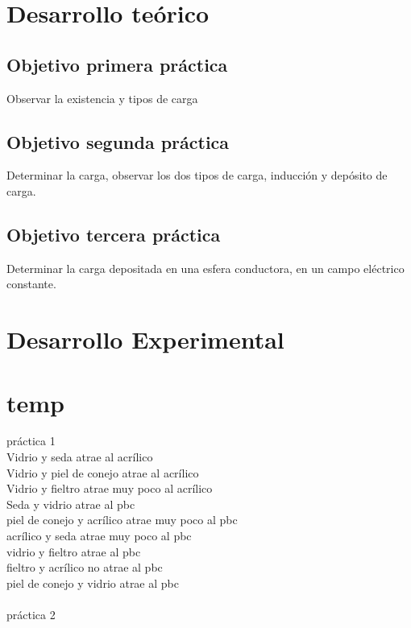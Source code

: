 \documentclass{article}
\begin{document}
\begin{multicols}{2}

\section{Desarrollo teórico}\label{Desarrollo Teorico}                              	%
\subsection*{Objetivo primera práctica}\label{Objetivo primera práctica}
	Observar la existencia y tipos de carga
\subsection*{Objetivo segunda práctica}\label{Objetivo segunda práctica}	
	Determinar la carga, observar los dos tipos de carga, inducción y depósito de carga.
\subsection*{Objetivo tercera práctica}\label{Objetivo tercera práctica}	
	Determinar la carga depositada en una esfera conductora, en un campo eléctrico constante.


\section{Desarrollo Experimental}\label{Desarrollo experimental}				%

\section{temp}\label{temp}
	práctica 1 \\
	Vidrio y seda atrae al acrílico\\ 
	Vidrio y piel de conejo atrae al acrílico\\ 
	Vidrio y fieltro atrae muy poco al acrílico\\ 

	Seda y vidrio atrae al pbc\\
	piel de conejo y acrílico atrae muy poco al pbc\\
	acrílico y seda atrae muy poco al pbc\\
	vidrio y fieltro atrae al pbc\\
	fieltro y acrílico no atrae al pbc\\
	piel de conejo y vidrio atrae al pbc\\ \\
	práctica 2 \\


\end{multicols}
\end{document}
